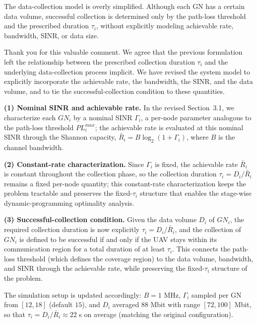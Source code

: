 \reviewer

\begin{revcomment}
	The data-collection model is overly simplified. Although each GN has a certain data volume, successful collection is determined only by the path-loss threshold and the prescribed duration $\tau_i$, without explicitly modeling achievable rate, bandwidth, SINR, or data size.
\end{revcomment}

\begin{revresponse}[]
	Thank you for this valuable comment. We agree that the previous formulation left the relationship between the prescribed collection duration $\tau_i$ and the underlying data-collection process implicit. We have revised the system model to explicitly incorporate the achievable rate, the bandwidth, the SINR, and the data volume, and to tie the successful-collection condition to these quantities.

	\textbf{(1) Nominal SINR and achievable rate.} In the revised Section~3.1, we characterize each $GN_i$ by a nominal SINR $\Gamma_i$, a per-node parameter analogous to the path-loss threshold $PL_i^{max}$; the achievable rate is evaluated at this nominal SINR through the Shannon capacity, $\bar{R}_i=B\log_2(1+\Gamma_i)$, where $B$ is the channel bandwidth.

	\textbf{(2) Constant-rate characterization.} Since $\Gamma_i$ is fixed, the achievable rate $\bar{R}_i$ is constant throughout the collection phase, so the collection duration $\tau_i=D_i/\bar{R}_i$ remains a fixed per-node quantity; this constant-rate characterization keeps the problem tractable and preserves the fixed-$\tau_i$ structure that enables the stage-wise dynamic-programming optimality analysis.

	\textbf{(3) Successful-collection condition.} Given the data volume $D_i$ of $GN_i$, the required collection duration is now explicitly $\tau_i=D_i/\bar{R}_i$, and the collection of $GN_i$ is defined to be successful if and only if the UAV stays within its communication region for a total duration of at least $\tau_i$. This connects the path-loss threshold (which defines the coverage region) to the data volume, bandwidth, and SINR through the achievable rate, while preserving the fixed-$\tau_i$ structure of the problem.

	The simulation setup is updated accordingly: $B=1$ MHz, $\Gamma_i$ sampled per GN from $[12,18]$ (default $15$), and $D_i$ averaged $88$ Mbit with range $[72,100]$ Mbit, so that $\tau_i=D_i/\bar{R}_i\approx22$ s on average (matching the original configuration).


\end{revresponse}

